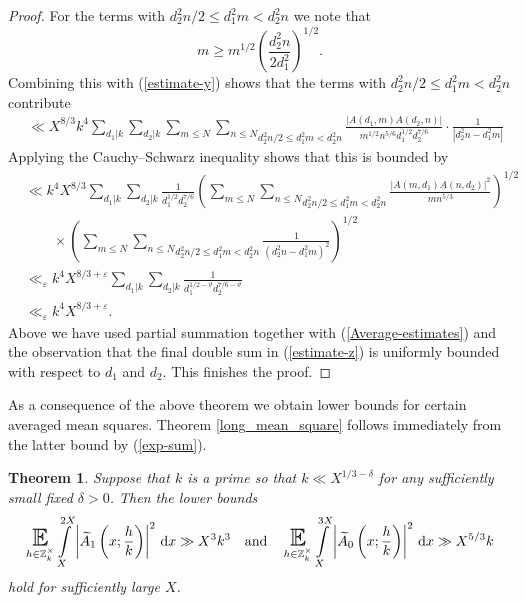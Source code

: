 \documentclass[a4paper,10pt,twoside]{amsart}
\newtheorem{theorem}{Theorem}[section]
\theoremstyle{definition}
\numberwithin{equation}{section}
\newcommand\E{\mathbb{E}}
\newcommand\eps{\varepsilon}
\renewcommand\:{\colon}
\begin{document}
\begin{proof}
For the terms with $d_2^2n/2\leq d_1^2m<d_2^2n$ we note that  
\[ 
m\geq m^{1/2}\left(\frac{d_2^2n}{2d_1^2}\right)^{1/2}.\]
Combining this with (\ref{estimate-y}) shows that the terms with $d_2^2n/2\leq d_1^2m<d_2^2n$ contribute
\begin{align*}
& \ll X^{8/3}k^4\sum_{d_1|k}\sum_{d_2|k}\sum_{m\leq N}\underset{d_2^2n/2\leq d_1^2m < d_2^2n}{\sum_{n\leqslant N}}\frac{|A(d_1,m)A(d_2,n)|}{m^{1/2}n^{5/6}d_1^{1/2}d_2^{7/6}}\cdot\frac1{|d_2^2n-d_1^2m|}
\end{align*}
Applying the Cauchy--Schwarz inequality shows that this is bounded by
\begin{align}\label{estimate-z}
&\ll k^4X^{8/3}\sum_{d_1|k}\sum_{d_2|k}\frac1{d_1^{1/2}d_2^{7/6}}\left(\sum_{m\leq N}\underset{d_2^2n/2\leq d_1^2m < d_2^2n}{\sum_{n\leqslant N}}\frac{|A(m,d_1)A(n,d_2)|^2}{mn^{5/3}}\right)^{1/2} \nonumber\\
&\qquad\times\left(\sum_{m\leq N}\underset{d_2^2n/2\leq d_1^2m < d_2^2n}{\sum_{n\leqslant N}}\frac1{(d_2^2n-d_1^2m)^2}\right)^{1/2}\\
&\ll_\eps k^4X^{8/3+\varepsilon}\sum_{d_1|k}\sum_{d_2|k}\frac1{d_1^{1/2-\vartheta}d_2^{7/6-\vartheta}} \nonumber\\
&\ll_\eps k^4X^{8/3+\varepsilon} \nonumber.
\end{align}
Above we have used partial summation together with (\ref{Average-estimates}) and the observation that the final double sum in (\ref{estimate-z}) is uniformly bounded with respect to $d_1$ and $d_2$. This finishes the proof.  
\end{proof}
           
\noindent As a consequence of the above theorem we obtain lower bounds for certain averaged mean squares. Theorem \ref{long_mean_square} follows immediately from the latter bound by (\ref{exp-sum}). 
\begin{theorem}\label{lower bounds}
Suppose that $k$ is a prime so that $k\ll X^{1/3-\delta}$ for any sufficiently small fixed $\delta>0$. Then the lower bounds
\[\mathop{\text{\LARGE$\E$}}_{h\in\mathbb Z_k^\times}\int\limits_X^{2X}\left|\widetilde A_1\left(x;\frac hk\right)\right|^2\,\mathrm dx\gg X^3k^3
\quad\text{and}\quad\mathop{\text{\LARGE$\E$}}_{h\in\mathbb Z_k^\times}\int\limits_X^{3X}\left|\widetilde A_0\left(x;\frac hk\right)\right|^2\,\mathrm dx\gg X^{5/3}k\]
hold for sufficiently large $X$.  
\end{theorem}
\end{document}

